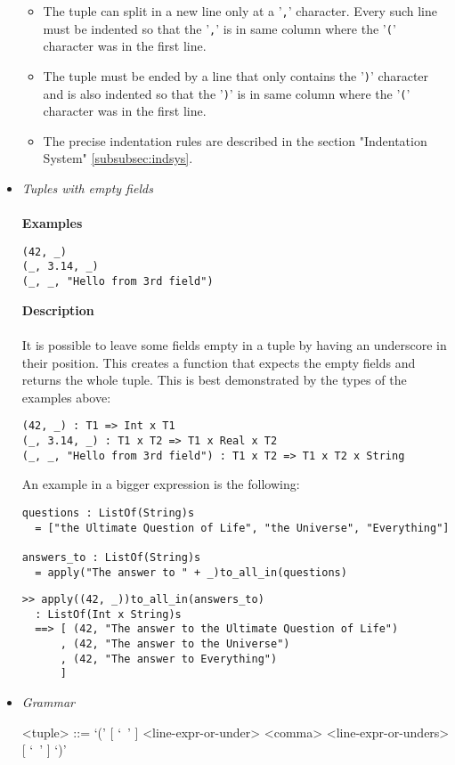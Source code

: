 \documentclass[diploma]{softlab-thesis}
\begin{document}
\begin{itemize}
\begin{itemize}
\item
The tuple can split in a new line only at a '\verb|,|' character. Every such
line must be indented so that the '\verb|,|' is in same column where the
'\verb|(|' character was in the first line.

\item
The tuple must be ended by a line that only contains the '\verb|)|' character
and is also indented so that the '\verb|)|' is in same column where the
'\verb|(|' character was in the first line.

\item
The precise indentation rules are described in the section
"Indentation System" \ref{subsubsec:indsys}.
\end{itemize}

\item \textit{Tuples with empty fields}
\\\\
\textbf{Examples}
\begin{verbatim}
(42, _)
(_, 3.14, _)
(_, _, "Hello from 3rd field")
\end{verbatim}

\textbf{Description}\\\\
It is possible to leave some fields empty in a tuple by having an underscore in
their position. This creates a function that expects the empty fields
and returns the whole tuple. This is best demonstrated by the types of the
examples above:
\begin{verbatim}
(42, _) : T1 => Int x T1
(_, 3.14, _) : T1 x T2 => T1 x Real x T2
(_, _, "Hello from 3rd field") : T1 x T2 => T1 x T2 x String
\end{verbatim}
An example in a bigger expression is the following:
\begin{verbatim}
questions : ListOf(String)s
  = ["the Ultimate Question of Life", "the Universe", "Everything"]

answers_to : ListOf(String)s
  = apply("The answer to " + _)to_all_in(questions)
\end{verbatim}

\newpage
\begin{verbatim}
>> apply((42, _))to_all_in(answers_to)
  : ListOf(Int x String)s
  ==> [ (42, "The answer to the Ultimate Question of Life")
      , (42, "The answer to the Universe")
      , (42, "The answer to Everything")
      ]
\end{verbatim}

\item \textit{Grammar}
\begin{grammar}
<tuple> ::=
`(' [ `\ ' ] <line-expr-or-under> <comma> <line-expr-or-unders> [ `\ ' ] `)'


\end{grammar}
\end{itemize}
\end{document}
